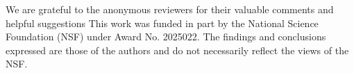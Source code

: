 \begin{acks}
We are grateful to the anonymous reviewers for their valuable comments and helpful suggestions
This work was funded in part by the National Science Foundation (NSF) under Award No. 2025022. The findings and conclusions expressed are those of the authors and do not necessarily reflect the views of the NSF.
\end{acks}
